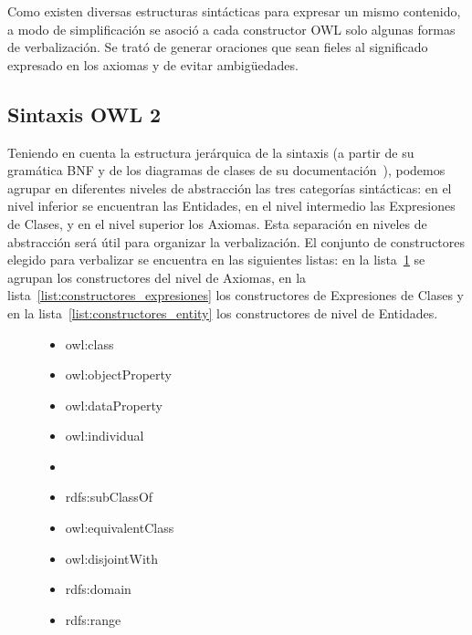 Como existen diversas estructuras sintácticas para expresar un mismo contenido, a modo de simplificación se asoció a cada constructor OWL solo algunas formas de verbalización. Se trató de generar oraciones que sean fieles al significado expresado en los axiomas y de evitar ambigüedades.

\subsection{Sintaxis OWL 2}
\label{sec:gen_doc_sintaxis_owl}
Teniendo en cuenta la estructura jerárquica de la sintaxis (a partir de su gramática BNF y de los diagramas de clases de su documentación~\cite{OWL2W3C}), podemos agrupar en diferentes niveles de abstracción las tres categorías sintácticas: en el nivel inferior se encuentran las Entidades, en el nivel intermedio las Expresiones de Clases, y en el nivel superior los Axiomas. Esta separación en niveles de abstracción será útil para organizar la verbalización. El conjunto de constructores elegido para verbalizar se encuentra en las siguientes listas: en la lista~\ref{list:constructores_axiomas} se agrupan los constructores del nivel de Axiomas, en la lista~\ref{list:constructores_expresiones} los constructores de Expresiones de Clases y en la lista~\ref{list:constructores_entity} los constructores de nivel de Entidades.
\begin{figure}
\begin{multicols}{2}
\label{list:constructores_entity}
    \begin{itemize}
        \item owl:class
        \item owl:objectProperty
        \item owl:dataProperty
        \item owl:individual
        \item[\vspace{\fill}]
    \end{itemize}

\label{list:constructores_axiomas}
    \begin{itemize}
        \item rdfs:subClassOf
        \item owl:equivalentClass
        \item owl:disjointWith
        \item rdfs:domain
        \item rdfs:range
    \end{itemize}
    \end{multicols}
\end{figure}


